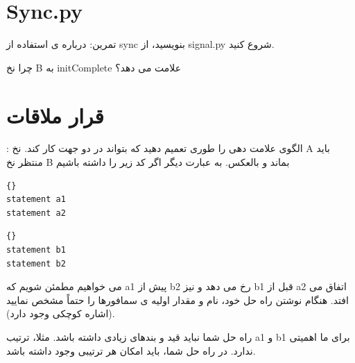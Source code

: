 \documentclass{book}
\begin{document}
\section{Sync.py}
\label{sync.py}

تمرین: درباره ی استفاده از sync بنویسید، از signal.py شروع کنید.

چرا نخ B به initComplete علامت می دهد؟


\section{قرار ملاقات}
\label{قرار ملاقات}

: الگوی علامت دهی را طوری تعمیم دهید که بتواند در دو جهت کار کند. نخ A باید منتظر نخ B بماند و بالعکس. به عبارت دیگر اگر کد زیر را داشته باشیم

\begin{minipage}[t]{2in}
\begin{lstlisting}[title={Thread A}]{}
statement a1
statement a2
\end{lstlisting}
\end{minipage}
\hfill
\begin{minipage}[t]{2in}
\begin{lstlisting}[title={Thread B}]{}
statement b1
statement b2
\end{lstlisting}
\end{minipage}
%
می خواهیم مطمئن شویم که a1 پیش از b2 رخ می دهد و نیز b1 قبل از a2 اتفاق می افتد. هنگام نوشتن راه حل خود، نام و مقدار اولیه ی سمافورها را حتماً مشخص نمایید (اشاره کوچکی وجود دارد).

راه حل شما نباید قید و بندهای زیادی داشته باشد. مثلا، ترتیب a1 و b1 برای ما اهمیتی ندارد. در راه حل شما، باید امکان هر ترتیبی وجود داشته باشد.
\end{document}
